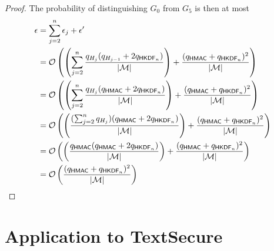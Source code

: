 \documentclass[compsoc, conference, letterpaper, 10pt, times]{IEEEtran}
\newcommand{\HKDF}{\mathsf{HKDF}}
\newcommand{\hmac}{\mathsf{HMAC}}
\newcommand{\Smac}{\mathcal{M}}
\begin{document}
\begin{proof}
The probability of distinguishing $G_0$ from $G_5$ is then
at most 
\begin{align*}
\epsilon &= \sum_{j=2}^n \epsilon_j + \epsilon' \\
&= {\cal O}\left(\left(\sum_{j=2}^n \frac{q_{H_{j}}(q_{H_{j-1}} + 2q_{\HKDF_n})}{|\Smac|} \right) + \frac{(q_{\hmac} + q_{\HKDF_n})^2}{|\Smac|}\right)\\
&= {\cal O}\left(\left(\sum_{j=2}^n \frac{q_{H_{j}}(q_{\hmac} + 2q_{\HKDF_n})}{|\Smac|} \right) + \frac{(q_{\hmac} + q_{\HKDF_n})^2}{|\Smac|}\right)\\
&= {\cal O}\left(\left(\frac{(\sum_{j=2}^nq_{H_{j}})(q_{\hmac} + 2 q_{\HKDF_n})}{|\Smac|} \right) + \frac{(q_{\hmac} + q_{\HKDF_n})^2}{|\Smac|}\right)\\
&= {\cal O}\left(\left(\frac{q_{\hmac}(q_{\hmac} + 2 q_{\HKDF_n})}{|\Smac|} \right) + \frac{(q_{\hmac} + q_{\HKDF_n})^2}{|\Smac|}\right)\\
&= {\cal O}\left(\frac{(q_{\hmac} + q_{\HKDF_n})^2}{|\Smac|}\right)\\
\end{align*}
\end{proof}


\section{Application to TextSecure}
\end{document}
